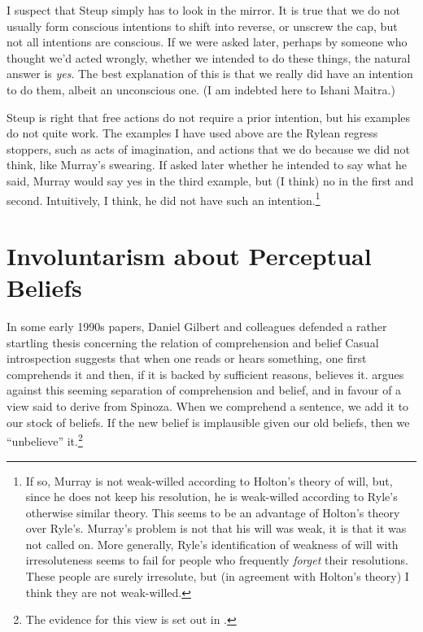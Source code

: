 I suspect that Steup simply has to look in the mirror. It is true that we do not usually form conscious intentions to shift into reverse, or unscrew the cap, but not all intentions are conscious. If we were asked later, perhaps by someone who thought we'd acted wrongly, whether we intended to do these things, the natural answer is \textit{yes}. The best explanation of this is that we really did have an intention to do them, albeit an unconscious one. (I am indebted here to Ishani Maitra.)

Steup is right that free actions do not require a prior intention, but his examples do not quite work. The examples I have used above are the Rylean regress stoppers, such as acts of imagination, and actions that we do because we did not think, like Murray's swearing. If asked later whether he intended to say what he said, Murray would say yes in the third example, but (I think) no in the first and second. Intuitively, I think, he did not have such an intention.\footnote{If so, Murray is not weak-willed according to Holton's theory of will, but, since he does not keep his resolution, he is weak-willed according to Ryle's otherwise similar theory. This seems to be an advantage of Holton's theory over Ryle's. Murray's problem is not that his will was weak, it is that it was not called on. More generally, Ryle's identification of weakness of will with irresoluteness seems to fail for people who frequently \textit{forget} their resolutions. These people are surely irresolute, but (in agreement with Holton's theory) I think they are not weak-willed. }


\section{Involuntarism about Perceptual Beliefs}

In some early 1990s papers, Daniel Gilbert and colleagues defended a rather startling thesis concerning the relation of comprehension and belief \citep{GilbertKrullMalone1990, Gilbert1991, GilbertTafarodiMalone1993} Casual introspection suggests that when one reads or hears something, one first comprehends it and then, if it is backed by sufficient reasons, believes it. \citet{Gilbert1991} argues against this seeming separation of comprehension and belief, and in favour of a view said to derive from Spinoza. When we comprehend a sentence, we add it to our stock of beliefs. If the new belief is implausible given our old beliefs, then we ``unbelieve'' it.\footnote{The evidence for this view is set out in  \citet{GilbertKrullMalone1990, GilbertTafarodiMalone1993}.} 

